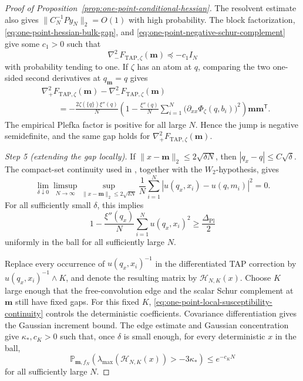 \documentclass[a4paper,10pt,reqno]{amsart}
\numberwithin{equation}{section}
\newcommand{\dP}{\mathbb{P}}%
\newcommand{\TAP}{\mathrm{TAP}}
\newcommand{\bfm}{\mathbf{m}}
\begin{document}
\begin{proof}[Proof of Proposition~\ref{prop:one-point-conditional-hessian}]
		The resolvent estimate also gives
		\(\|C_N^{-1}Py_N\|_2=O(1)\) with high probability. The block
		factorization, \eqref{eq:one-point-hessian-bulk-gap}, and
		\eqref{eq:one-point-negative-schur-complement} give some \(c_1>0\)
		such that
		\[
		\nabla_-^2F_{\TAP,\zeta}(\bfm)\preceq-c_1I_N
		\]
		with probability tending to one. If \(\zeta\) has an atom at \(q\),
		comparing the two one-sided second derivatives at \(q_\bfm=q\) gives
		\begin{equation}\label{eq:one-point-hessian-jump}
			\begin{aligned}
				&\nabla_+^2F_{\TAP,\zeta}(\bfm)
				-\nabla_-^2F_{\TAP,\zeta}(\bfm)\\
				&\qquad=
				-\frac{2\zeta(\{q\})\xi''(q)}N
				\left(
				1-\frac{\xi''(q)}N\sum_{i=1}^N
				\bigl(\partial_{xx}\Phi_\zeta(q,b_i)\bigr)^2
				\right)\bfm\bfm^{\mathsf T}.
			\end{aligned}
		\end{equation}
		The empirical Plefka factor is positive for all large \(N\). Hence the
		jump is negative semidefinite, and the same gap holds for
		\(\nabla_+^2F_{\TAP,\zeta}(\bfm)\).
		
		\medskip\noindent\emph{Step 5 (extending the gap locally).}
		If \(\|x-\bfm\|_2\le2\sqrt{\delta N}\), then
		\(|q_x-q|\le C\sqrt\delta\). The compact-set continuity used in
		\cite[Proof of Lemma~C.4]{TAPIsing}, together with the \(W_2\)-hypothesis,
		gives
		\begin{equation}\label{eq:one-point-local-susceptibility-continuity}
			\lim_{\delta\downarrow0}\limsup_{N\to\infty}
			\sup_{\|x-\bfm\|_2\le2\sqrt{\delta N}}
			\frac1N\sum_{i=1}^N
			\left|
			u(q_x,x_i)-u(q,m_i)
			\right|^2
			=0.
		\end{equation}
		For all sufficiently small \(\delta\), this implies
		\[
		1-\frac{\xi''(q_x)}N\sum_{i=1}^N
		u(q_x,x_i)^2
		\ge\frac{\Delta_{\mathrm{Pl}}}{2}
		\]
		uniformly in the ball for all sufficiently large \(N\).
		
		Replace every occurrence of
		\(u(q_x,x_i)^{-1}\) in the differentiated TAP correction by
		\(u(q_x,x_i)^{-1}\wedge K\), and denote the resulting matrix by
		\(\mathcal H_{N,K}(x)\). Choose \(K\) large enough that the
		free-convolution edge and the scalar Schur complement at \(\bfm\)
		still have fixed gaps. For this fixed \(K\),
		\eqref{eq:one-point-local-susceptibility-continuity} controls the
		deterministic coefficients. Covariance differentiation gives the Gaussian
		increment bound. The edge estimate and Gaussian concentration give
		\(\kappa_*,c_K>0\) such that, once \(\delta\) is small enough, for
		every deterministic \(x\) in the ball,
		\[
		\dP_{\bfm,f_N}\left(
		\lambda_{\max}\!\left(
		\mathcal H_{N,K}(x)
		\right)>-3\kappa_*
		\right)
		\le e^{-c_KN}
		\]
		for all sufficiently large \(N\).
		

\end{proof}
\end{document}

